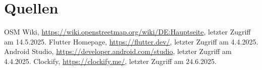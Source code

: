 \documentclass[11pt,a4paper]{article}
\begin{document}
\section{Quellen}
\begin{thebibliography}{8}
    OSM Wiki, \url{https://wiki.openstreetmap.org/wiki/DE:Hauptseite}, letzter Zugriff am 14.5.2025.
    Flutter Homepage, \url{https://flutter.dev/}, letzter Zugriff am 4.4.2025.
    Android Studio, \url{https://developer.android.com/studio}, letzter Zugriff am 4.4.2025.
    Clockify, \url{https://clockify.me/}, letzter Zugriff am 24.6.2025.
\end{thebibliography}
\end{document}
